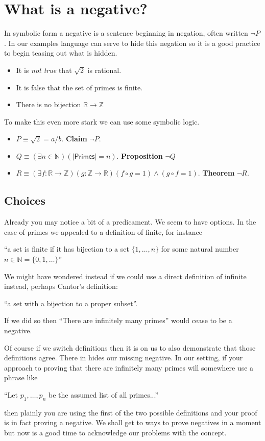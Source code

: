 \documentclass{amsart}
\begin{document}
\section{What is a negative?}
In symbolic form a negative is a sentence beginning in negation, 
often written $\neg P$.  In our examples language can serve to 
hide this negation so it is a good practice to begin teasing out 
what is hidden.
\begin{itemize}
    \item It is \emph{not true} that $\sqrt{2}$ is rational.
    \item It is false that the set of primes is finite.
    \item There is no bijection $\mathbb{R}\to \mathbb{Z}$
\end{itemize}
To make this even more stark we can use some symbolic logic.
\begin{itemize}
    \item $P\equiv \sqrt{2}=a/b$.  \textbf{Claim} $\neg P$.
    \item $Q\equiv (\exists n\in \mathbb{N})(|\mathsf{Primes}|=n)$. 
    \textbf{Proposition} $\neg Q$
    \item $R\equiv (\exists f:\mathbb{R}\to \mathbb{Z})(g:\mathbb{Z}\to \mathbb{R})(f\circ g=1)\wedge (g\circ f=1)$.
    \textbf{Theorem} $\neg R$.
\end{itemize}

\subsection*{Choices}
Already you may notice a bit of a predicament.  We seem to have options.  In the
case of primes we appealed to a definition of finite, for instance
\begin{center} 
    ``a set is finite
if it has bijection to a set $\{1,\ldots,n\}$ for some natural number $n\in
\mathbb{N}=\{0,1,\ldots\}$''
\end{center}
We might have wondered instead if we could use a direct definition of 
infinite instead, perhaps Cantor's definition:
\begin{center}
    ``a set with a bijection to a proper subset''.
\end{center}
If we did so then ``There are infinitely many primes'' would cease 
to be a negative.  

Of course if we switch definitions then 
it is on us to also demonstrate that those definitions agree.
There in hides our missing negative.
In our setting, if your approach to proving that there are 
infinitely many primes will somewhere use a phrase like 
\begin{center}
    ``Let $p_1,\ldots,p_n$ be the assumed list of all primes...''
\end{center}
then plainly you are using the first of the two possible definitions 
and your proof is in fact proving a negative.  We shall get to ways to 
prove negatives in a moment but now is a good time to acknowledge our 
problems with the concept.
\end{document}
